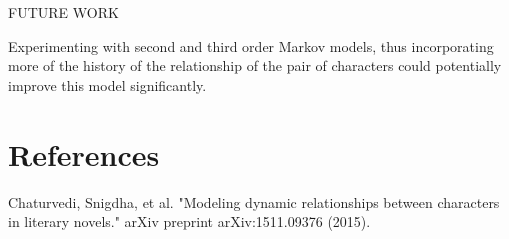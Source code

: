 \documentclass[11pt,a4paper]{article}
\begin{document}
FUTURE WORK 

Experimenting with second and third order Markov models, thus incorporating more of the history of the relationship of the pair of characters could potentially improve this model significantly.

\section{References}
Chaturvedi, Snigdha, et al. "Modeling dynamic relationships between characters in literary novels." arXiv preprint arXiv:1511.09376 (2015).



%
%
%
%
\end{document}
